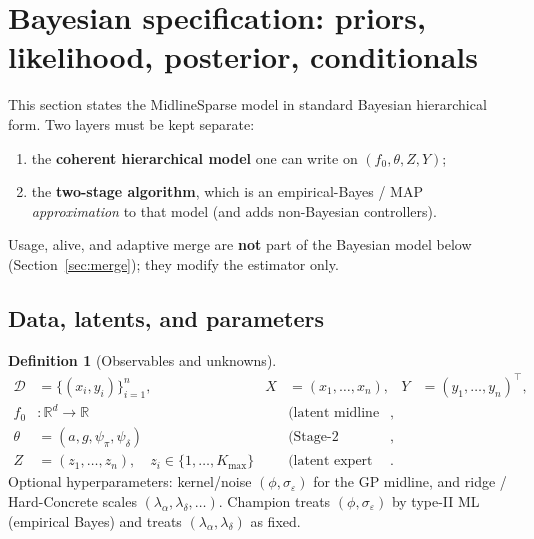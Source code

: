 \documentclass[11pt,a4paper]{article}
\theoremstyle{plain}
\theoremstyle{definition}
\newtheorem{definition}[theorem]{Definition}
\theoremstyle{remark}
\newcommand{\R}{\mathbb{R}}
\newcommand{\D}{\mathcal{D}}
\newcommand{\tht}{\theta}
\newcommand{\Kmax}{K_{\max}}
\begin{document}
\section{Bayesian specification: priors, likelihood, posterior, conditionals}
\label{sec:bayes-spec}

This section states the MidlineSparse model in standard Bayesian hierarchical form.
Two layers must be kept separate:
\begin{enumerate}[leftmargin=1.4em,itemsep=0.15em]
  \item the \textbf{coherent hierarchical model} one can write on
        \((f_0,\tht,Z,Y)\);
  \item the \textbf{two-stage algorithm}, which is an empirical-Bayes / MAP
        \emph{approximation} to that model (and adds non-Bayesian controllers).
\end{enumerate}
Usage, alive, and adaptive merge are \textbf{not} part of the Bayesian model below
(Section~\ref{sec:merge}); they modify the estimator only.

\subsection{Data, latents, and parameters}
\begin{definition}[Observables and unknowns]
\begin{align*}
  \D &= \{(x_i,y_i)\}_{i=1}^n,
  &
  X &= (x_1,\ldots,x_n),
  &
  Y &= (y_1,\ldots,y_n)^\top,
  \\
  f_0
  &:
  \R^d\to\R
  &&
  \text{(latent midline function)},
  \\
  \tht
  &=
  (a,g,\psi_\pi,\psi_\delta)
  &&
  \text{(Stage-2 parameters; Def.\ below)},
  \\
  Z
  &=
  (z_1,\ldots,z_n),
  \quad
  z_i\in\{1,\ldots,\Kmax\}
  &&
  \text{(latent expert assignments)}.
\end{align*}
Optional hyperparameters: kernel/noise \((\phi,\sigma_\varepsilon)\) for the GP midline,
and ridge / Hard-Concrete scales \((\lambda_\alpha,\lambda_\delta,\ldots)\).
Champion treats \((\phi,\sigma_\varepsilon)\) by type-II ML (empirical Bayes) and treats
\((\lambda_\alpha,\lambda_\delta)\) as fixed.
\end{definition}
\end{document}
